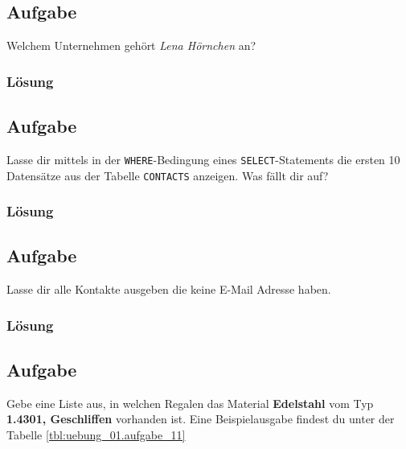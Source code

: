 \subsection{Aufgabe}
\label{sec:uebung_01.aufgabe_08}
Welchem Unternehmen gehört \textit{Lena Hörnchen} an?

\subsubsection*{Lösung}
\label{sec:uebung_01.aufgabe_08.loesung}

\subsection{Aufgabe}
\label{sec:uebung_01.aufgabe_09}
Lasse dir mittels  in der \texttt{WHERE}-Bedingung eines \texttt{SELECT}-Statements die ersten 10 Datensätze aus der Tabelle \texttt{CONTACTS} anzeigen. Was fällt dir auf?

\subsubsection*{Lösung}
\label{sec:uebung_01.aufgabe_09.loesung}

\subsection{Aufgabe}
\label{sec:uebung_01.aufgabe_10}
Lasse dir alle Kontakte ausgeben die keine E-Mail Adresse haben.

\subsubsection*{Lösung}
\label{sec:uebung_01.aufgabe_10.loesung}

\subsection{Aufgabe}
\label{sec:uebung_01.aufgabe_11}
Gebe eine Liste aus, in welchen Regalen das Material \textbf{Edelstahl} vom Typ \textbf{1.4301, Geschliffen} vorhanden ist. Eine Beispielausgabe findest du unter der Tabelle \ref{tbl:uebung_01.aufgabe_11}


